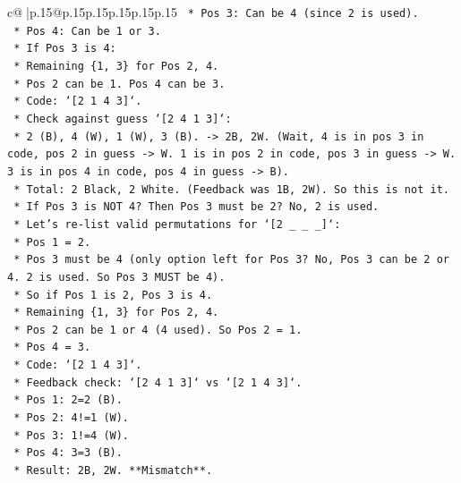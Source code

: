 \documentclass{article}
\begin{document}
{\begin{supertabular}{c@{$\;$}|p{.15\linewidth}@{}p{.15\linewidth}p{.15\linewidth}p{.15\linewidth}p{.15\linewidth}p{.15\linewidth}}
{{{\texttt{            *   Pos 3: Can be 4 (since 2 is used).} \\
\texttt{            *   Pos 4: Can be 1 or 3.} \\
\texttt{        *   If Pos 3 is 4:} \\
\texttt{            *   Remaining \{1, 3\} for Pos 2, 4.} \\
\texttt{            *   Pos 2 can be 1. Pos 4 can be 3.} \\
\texttt{            *   Code: `{[}2 1 4 3{]}`.} \\
\texttt{            *   Check against guess `{[}2 4 1 3{]}`:} \\
\texttt{                *   2 (B), 4 (W), 1 (W), 3 (B). {-}> 2B, 2W. (Wait, 4 is in pos 3 in code, pos 2 in guess {-}> W. 1 is in pos 2 in code, pos 3 in guess {-}> W. 3 is in pos 4 in code, pos 4 in guess {-}> B).} \\
\texttt{                *   Total: 2 Black, 2 White. (Feedback was 1B, 2W). So this is not it.} \\
\texttt{        *   If Pos 3 is NOT 4? Then Pos 3 must be 2? No, 2 is used.} \\
\texttt{        *   Let's re{-}list valid permutations for `{[}2 \_ \_ \_{]}`:} \\
\texttt{            *   Pos 1 = 2.} \\
\texttt{            *   Pos 3 must be 4 (only option left for Pos 3? No, Pos 3 can be 2 or 4. 2 is used. So Pos 3 MUST be 4).} \\
\texttt{            *   So if Pos 1 is 2, Pos 3 is 4.} \\
\texttt{            *   Remaining \{1, 3\} for Pos 2, 4.} \\
\texttt{            *   Pos 2 can be 1 or 4 (4 used). So Pos 2 = 1.} \\
\texttt{            *   Pos 4 = 3.} \\
\texttt{            *   Code: `{[}2 1 4 3{]}`.} \\
\texttt{            *   Feedback check: `{[}2 4 1 3{]}` vs `{[}2 1 4 3{]}`.} \\
\texttt{                *   Pos 1: 2=2 (B).} \\
\texttt{                *   Pos 2: 4!=1 (W).} \\
\texttt{                *   Pos 3: 1!=4 (W).} \\
\texttt{                *   Pos 4: 3=3 (B).} \\
\texttt{                *   Result: 2B, 2W. **Mismatch**.} \\
}}}
\end{supertabular}}
\end{document}

